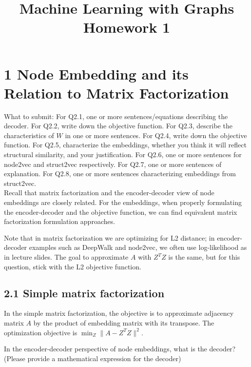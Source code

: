 \documentclass{article}
\title{Machine Learning with Graphs\\
Homework 1}
\begin{document}
\maketitle



\section*{1 Node Embedding and its Relation to Matrix Factorization}

What to submit: For Q2.1, one or more sentences/equations describing the decoder. For Q2.2, write down the objective function. For Q2.3, describe the characteristics of $W$ in one or more sentences. For Q2.4, write down the objective function. For Q2.5, characterize the embeddings, whether you think it will reflect structural similarity, and your justification. For Q2.6, one or more sentences for node2vec and struct2vec respectively. For Q2.7, one or more sentences of explanation. For Q2.8, one or more sentences characterizing embeddings from struct2vec.
\\

Recall that matrix factorization and the encoder-decoder view of node embeddings are closely related. For the embeddings, when properly formulating the encoder-decoder and the objective function, we can find equivalent matrix factorization formulation approaches.

Note that in matrix factorization we are optimizing for L2 distance; in encoder-decoder examples such as DeepWalk and node2vec, we often use log-likelihood as in lecture slides. The goal to approximate $A$ with $Z^TZ$ is the same, but for this question, stick with the L2 objective function.

\subsection*{2.1 Simple matrix factorization}

In the simple matrix factorization, the objective is to approximate adjacency matrix $A$ by the product of embedding matrix with its transpose. The optimization objective is $\min_Z \|A - Z^TZ\|^2$.

In the encoder-decoder perspective of node embeddings, what is the decoder? (Please provide a mathematical expression for the decoder)
\end{document}
